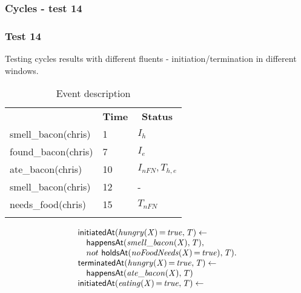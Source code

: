 \documentclass[8pt]{beamer}
\DeclareMathOperator{\val}{=}  %
\def \patsize {}
\def\happensAt{\textsf{\patsize happensAt}}
\def\holdsAt{\textsf{\patsize holdsAt}}
\def\initiatedAt{\textsf{\patsize initiatedAt}}
\def\terminatedAt{\textsf{\patsize terminatedAt}}
\newenvironment{mysplit}%
  {\arraycolsep 0pt \begin{array}{l}}%
  {\end{array}}
\begin{document}
\begin{frame}
    \frametitle{Cycles - test 14}
    \subsubsection{Test 14}
    \small
    Testing cycles results with different fluents - initiation/termination in different windows.\linebreak
    \begin{minipage}{0.4\linewidth}
        \begin{table}[t!]
            \caption{Event description}
            \begin{center}

                \begin{tabular}{lll}
                    \hline\noalign{\smallskip}
                    \multicolumn{1}{l}{\textbf{Event}} & \multicolumn{1}{c}{\textbf{Time}} & \multicolumn{1}{c}{\textbf{Status}} \\
                    smell\_bacon(chris)& 1 & $I_{h}$\\
                    found\_bacon(chris)& 7 & $I_{e}$\\
                    ate\_bacon(chris)& 10  & $I_{nFN},T_{h,e}$\\
                    smell\_bacon(chris)& 12 & -\\
                    needs\_food(chris)& 15 & $T_{nFN}$\\
                    \noalign{\smallskip}
                    \hline
                \end{tabular}
            \end{center}
        \end{table}
    \end{minipage}
    \begin{minipage}{0.55\linewidth}
        \begin{align*}
            \begin{mysplit}
                \initiatedAt\mathit{(hungry(X)\val true,T)\leftarrow}\\
                \quad    \happensAt\mathit{(smell\_bacon(X),T),}\\
                \quad    not\ \holdsAt\mathit{(noFoodNeeds(X)\val true),T).}\\
                \terminatedAt\mathit{(hungry(X)\val true,T)\leftarrow}\\
                \quad    \happensAt\mathit{(ate\_bacon(X),T)}\\
                \initiatedAt\mathit{(eating(X)\val true,T)\leftarrow}\\

\end{mysplit}
\end{align*}
\end{minipage}
\end{frame}
\end{document}
